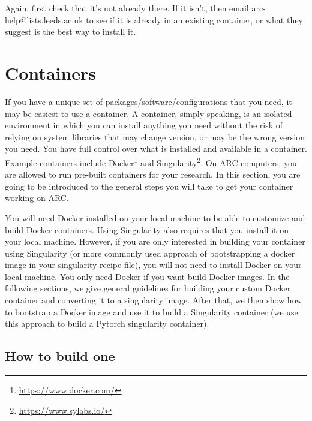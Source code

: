 \documentclass[]{article}
\begin{document}
Again, first check that it's not already there. If it isn't, then email arc-help@lists.leeds.ac.uk to see if it is already in an existing container, or what they suggest is the best way to install it.

\section{Containers}

If you have a unique set of packages/software/configurations that you need, it may be easiest to use a container. A container, simply speaking, is an isolated environment in which you can install anything you need without the risk of relying on system libraries that may change version, or may be the wrong version you need. You have full control over what is installed and available in a container. Example containers include Docker\footnote{\url{https://www.docker.com/}} and Singularity\footnote{\url{https://www.sylabs.io/}}. On ARC computers, you are allowed to run pre-built containers for your research. In this section, you are going to be introduced to the general steps you will take to get your container working on ARC.

You will need Docker installed on your local machine to be able to customize and build Docker containers. Using Singularity also requires that you install it on your local machine. However, if you are only interested in building your container using Singularity (or more commonly used approach of bootstrapping a docker image in your singularity recipe file), you will not need to install Docker on your local machine. You only need Docker if you want build Docker images. In the following sections, we give general guidelines for building your custom Docker container and converting it to a singularity image. After that, we then show how to bootstrap a Docker image and use it to build a Singularity container (we use this approach to build a Pytorch singularity container).


\subsection{How to build one}
\end{document}
